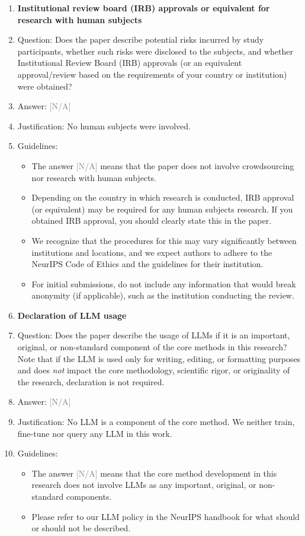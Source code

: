 \documentclass{article}
\providecommand{\answerNA}[1][]{\textcolor{gray}{[N/A] #1}}
\begin{document}
\begin{enumerate}
\item {\bf Institutional review board (IRB) approvals or equivalent for research with human subjects}
    \item[] Question: Does the paper describe potential risks incurred by study participants, whether such risks were disclosed to the subjects, and whether Institutional Review Board (IRB) approvals (or an equivalent approval/review based on the requirements of your country or institution) were obtained?
    \item[] Answer: \answerNA{}
    \item[] Justification: No human subjects were involved.
    \item[] Guidelines:
    \begin{itemize}
        \item The answer \answerNA{} means that the paper does not involve crowdsourcing nor research with human subjects.
        \item Depending on the country in which research is conducted, IRB approval (or equivalent) may be required for any human subjects research. If you obtained IRB approval, you should clearly state this in the paper.
        \item We recognize that the procedures for this may vary significantly between institutions and locations, and we expect authors to adhere to the NeurIPS Code of Ethics and the guidelines for their institution.
        \item For initial submissions, do not include any information that would break anonymity (if applicable), such as the institution conducting the review.
    \end{itemize}

\item {\bf Declaration of LLM usage}
    \item[] Question: Does the paper describe the usage of LLMs if it is an important, original, or non-standard component of the core methods in this research? Note that if the LLM is used only for writing, editing, or formatting purposes and does \emph{not} impact the core methodology, scientific rigor, or originality of the research, declaration is not required.
    \item[] Answer: \answerNA{}
    \item[] Justification: No LLM is a component of the core method. We neither train, fine-tune nor query any LLM in this work.
    \item[] Guidelines:
    \begin{itemize}
        \item The answer \answerNA{} means that the core method development in this research does not involve LLMs as any important, original, or non-standard components.
        \item Please refer to our LLM policy in the NeurIPS handbook for what should or should not be described.
    \end{itemize}

\end{enumerate}
\end{document}
